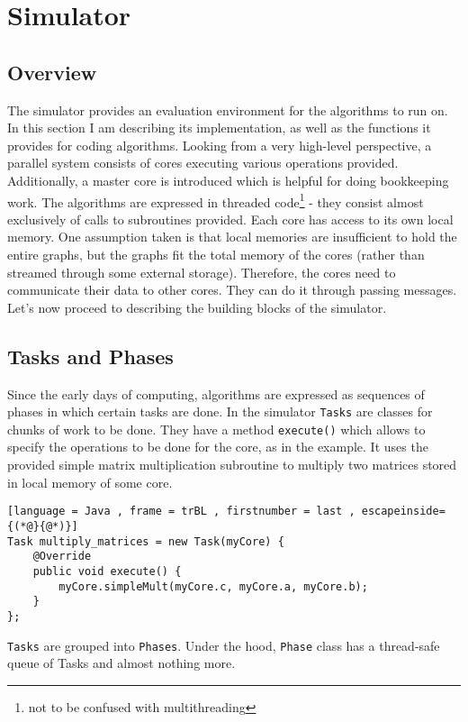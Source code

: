 \documentclass[12pt,a4paper,twoside,openright]{report}
\begin{document}
\section{Simulator}
\subsection{Overview}
The simulator provides an evaluation environment for the algorithms to run on. In this section I am describing its implementation, as well as the functions it provides for coding algorithms. Looking from a very high-level perspective, a parallel system consists of cores executing various operations provided. Additionally, a master core is introduced which is helpful for doing bookkeeping work.
The algorithms are expressed in threaded code\footnote{not to be confused with multithreading} - they consist almost exclusively of calls to subroutines provided. Each core has access to its own local memory. One assumption taken is that local memories are insufficient to hold the entire graphs, but the graphs fit the total memory of the cores (rather than streamed through some external storage). Therefore, the cores need to communicate their data to other cores. They can do it through passing messages. Let's now proceed to describing the building blocks of the simulator.

\subsection{Tasks and Phases}
Since the early days of computing, algorithms are expressed as sequences of phases in which certain tasks are done. In the simulator \texttt{Tasks} are classes for chunks of work to be done. They have a method \texttt{execute()} which allows to specify the operations to be done for the core, as in the example. It uses the provided simple matrix multiplication subroutine to multiply two matrices stored in local memory of some core. 

\begin{lstlisting}[language = Java , frame = trBL , firstnumber = last , escapeinside={(*@}{@*)}]
Task multiply_matrices = new Task(myCore) {
    @Override
    public void execute() {
        myCore.simpleMult(myCore.c, myCore.a, myCore.b);
    }
};
\end{lstlisting}


\texttt{Tasks} are grouped into \texttt{Phases}. Under the hood, \texttt{Phase} class has a thread-safe queue of Tasks and almost nothing more.
\end{document}
